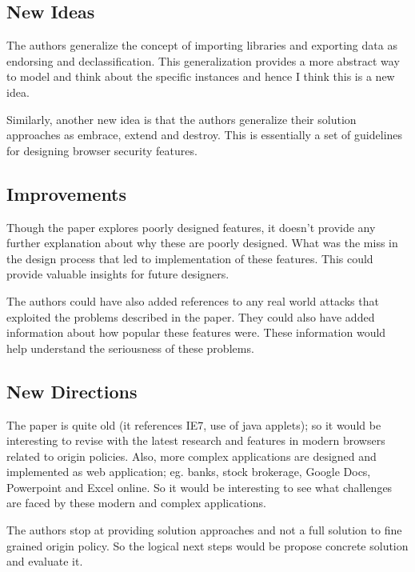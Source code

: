 \documentclass[12pt]{article}
\begin{document}
    \subsection*{New Ideas}
    The authors generalize the concept of importing libraries and exporting data as endorsing and declassification. This generalization provides a more abstract way to model and think about the specific instances and hence I think this is a new idea.

    Similarly, another new idea is that the authors generalize their solution approaches as embrace, extend and destroy. This is essentially a set of guidelines for designing browser security features.

    \subsection*{Improvements}
    Though the paper explores poorly designed features, it doesn't provide any further explanation about why these are poorly designed. What was the miss in the design process that led to implementation of these features. This could provide valuable insights for future designers.

    The authors could have also added references to any real world attacks that exploited the problems described in the paper. They could also have added information about how popular these features were. These information would help understand the seriousness of these problems.

    \subsection*{New Directions}
    The paper is quite old (it references IE7, use of java applets); so it would be interesting to revise with the latest research and features in modern browsers related to origin policies. Also, more complex applications are designed and implemented as web application; eg. banks, stock brokerage, Google Docs, Powerpoint and Excel online. So it would be interesting to see what challenges are faced by these modern and complex applications.

    The authors stop at providing solution approaches and not a full solution to fine grained origin policy. So the logical next steps would be propose concrete solution and evaluate it.
\end{document}
